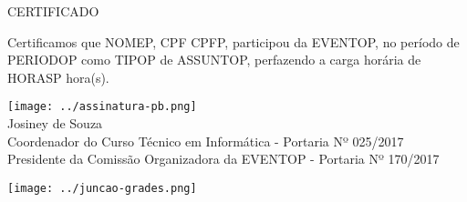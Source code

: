 \documentclass{abnt}
\begin{document}
\BgThispage
\color{CONF_COR}
\bf
\begin{center}
    \Huge{CERTIFICADO}
\end{center}

Certificamos que NOMEP, CPF CPFP, participou da EVENTOP, no período de
PERIODOP como TIPOP de ASSUNTOP, perfazendo a carga horária de
HORASP hora(s).


\begin{center}
\texttt{[image: ../assinatura-pb.png]}\\
Josiney de Souza\\
Coordenador do Curso Técnico em Informática - Portaria Nº 025/2017\\
Presidente da Comissão Organizadora da EVENTOP - Portaria Nº 170/2017
\end{center}

\newpage
{}

\texttt{[image: ../juncao-grades.png]}
\end{document}
